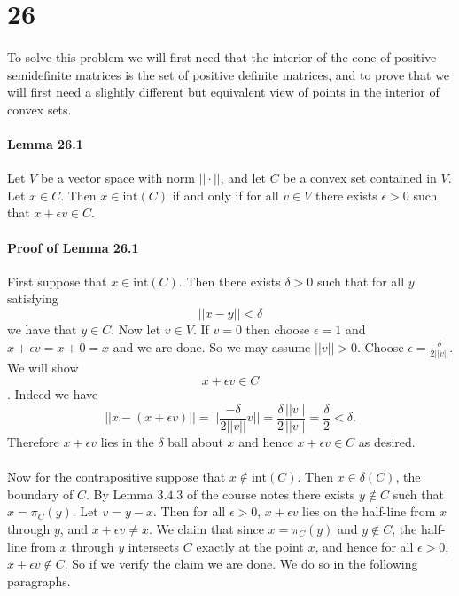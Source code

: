 \documentclass[letterpaper,12pt,oneside,onecolumn]{article}
\begin{document}
\section*{26}
\paragraph{}
To solve this problem we will first need that the interior of the cone of positive semidefinite matrices is the set of positive definite matrices, and to prove that we will first need a slightly different but equivalent view of points in the interior of convex sets.
\paragraph{Lemma 26.1}
Let $V$ be a vector space with norm $|| \cdot ||$, and let $C$ be a convex set contained in $V$. Let $x \in C$. Then $x \in \text{int}(C)$ if and only if for all $v \in V$ there exists $\epsilon >0$ such that $x + \epsilon v \in C$.
\paragraph{Proof of Lemma 26.1}
First suppose that $x \in \text{int}(C)$. Then there exists $\delta > 0$ such that for all $y$ satisfying $$|| x - y|| < \delta$$ we have that $y \in C$. Now let $v \in V$. If $v = 0$ then choose $\epsilon = 1$ and $x + \epsilon v = x + 0 = x$ and we are done. So we may assume $|| v|| > 0$.  Choose $\epsilon = \frac{\delta}{2 ||v||}$. We will show $$x + \epsilon v \in C$$. Indeed we have $$|| x - (x+\epsilon v)|| = || \frac{-\delta}{2||v||} v|| = \frac{\delta}{2}\frac{||v||}{||v||} = \frac{\delta}{2} < \delta.$$
Therefore $x +\epsilon v$ lies in the $\delta$ ball about $x$ and hence $x+\epsilon v \in C$ as desired.
\paragraph{}
Now for the contrapositive suppose that $x \not\in \text{int}(C)$. Then $x \in \delta(C)$, the boundary of $C$. By Lemma $3.4.3$ of the course notes there exists $y \not\in C$ such that $x = \pi_C(y)$. Let $v = y - x$. Then for all $\epsilon > 0$, $x + \epsilon v$ lies on the half-line from $x$ through $y$, and $x + \epsilon v \neq x$. We claim that since $x =\pi_C(y)$ and $y \not \in C$, the half-line from $x$ through $y$ intersects $C$ exactly at the point $x$, and hence for all $\epsilon > 0$, $x+ \epsilon v \not \in C$. So if we verify the claim we are done. We do so in the following paragraphs.
\end{document}
